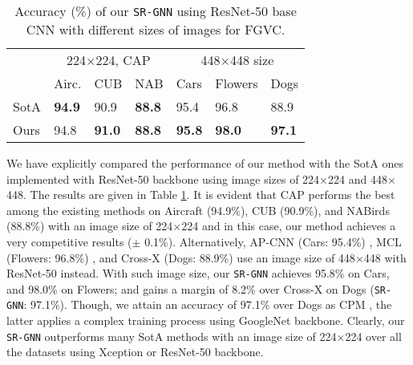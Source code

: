 \documentclass[journal]{IEEEtran}
\begin{document}
\begin{table}
\begin{center}
 \caption{Accuracy (\%) of our \texttt{SR-GNN} using ResNet-50 base CNN with different sizes of images for FGVC.} 
 \label{table:RN50}
\begin{tabular}{|p{0.5cm}|p{0.68 cm}p{0.68 cm}p{0.68 cm}|p{1.03 cm}p{1.03 cm}p{1.2 cm}|}
 \hline
\multicolumn{1}{|c|}{}&
\multicolumn{3}{c|}{224$\times$224, CAP \cite{behera2021context}}&   \multicolumn{3}{c|}{448$\times$448 size} \\
 & Airc. &CUB &NAB&Cars&Flowers&Dogs  \\
    \hline
SotA &\textbf{94.9} &90.9 & \textbf{88.8}&95.4\cite{ding2021ap}  &96.8\cite{chang2020devil} & {88.9} \cite{luo2019cross}\\   \hline
Ours & {94.8} &\textbf{91.0} & \textbf{88.8}  &\textbf{95.8} &\textbf{98.0} &\textbf{97.1} \\
\hline
\end{tabular} \end{center}
  \vspace{-0.6cm}
\end{table}

We have explicitly compared the performance of our method with the SotA ones implemented with ResNet-50 backbone using image sizes of 224$\times$224 and 448$\times$448. The results are given in Table \ref{table:RN50}. It is evident that CAP performs the best among the existing methods on Aircraft (94.9\%), CUB (90.9\%), and NABirds (88.8\%) with an image size of 224$\times$224 and in  this case, our method achieves a very competitive results ($\pm$ 0.1\%).  Alternatively, AP-CNN (Cars: 95.4\%) \cite{ding2021ap}, MCL (Flowers: 96.8\%) \cite{chang2020devil}, and Cross-X (Dogs: 88.9\%) \cite{luo2019cross} use an image size of 448$\times$448 with ResNet-50 instead. With such image size, our \texttt{SR-GNN} achieves 95.8\% on Cars, and 98.0\% on Flowers; and gains a margin of 8.2\% over Cross-X on Dogs (\texttt{SR-GNN}: 97.1\%). Though, we attain an accuracy of 97.1\%  over Dogs as CPM \cite{ge2019weakly}, the latter applies a complex training process using GoogleNet backbone. Clearly, our \texttt{SR-GNN} outperforms many SotA methods with an image size of 224$\times$224 over all the datasets using Xception or ResNet-50 backbone. 
\end{document}
